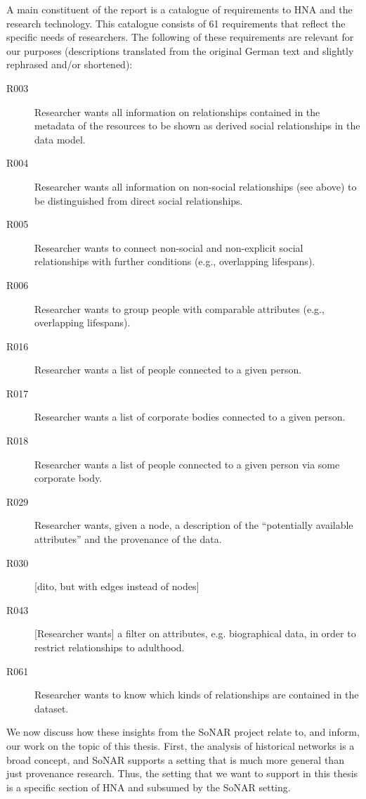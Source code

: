 A main constituent of the report is a catalogue of requirements
to HNA and the research technology. This catalogue consists of 61
requirements that reflect the specific needs of researchers.
The following of these requirements are relevant for our purposes
(descriptions translated from the original German text and slightly rephrased and/or shortened):
%
\begin{description}
  \item[R003]
    Researcher wants all information on relationships contained in the metadata of the resources
    to be shown as derived social relationships in the data model.
  \item[R004]
    Researcher wants all information on non-social
    relationships (see above) to be distinguished from direct social relationships.
  \item[R005]
    Researcher wants to connect non-social and non-explicit social relationships
    with further conditions (e.g., overlapping lifespans).
  \item[R006]
    Researcher wants to group people with comparable attributes (e.g., overlapping lifespans).
  \item[R016]
    Researcher wants a list of people connected to a given person.
  \item[R017]
    Researcher wants a list of corporate bodies connected to a given person.
  \item[R018]
    Researcher wants a list of people connected to a given person via some corporate body.
  \item[R029]
    Researcher wants, given a node, a description of the \enquote{potentially available attributes}
    and the provenance of the data.
  \item[R030]
    [dito, but with edges instead of nodes]
  \item[R043]
    [Researcher wants] a filter on attributes, e.g. biographical data, in order to
    restrict relationships to adulthood.
  \item[R061]
    Researcher wants to know which kinds of relationships are contained in the dataset.
\end{description}

We now discuss how these insights from the SoNAR project relate to, and inform, our work on the topic of this thesis.
First, the analysis of historical networks is a broad concept, and SoNAR supports a setting
that is much more general than just provenance research.
Thus, the setting that we want to support in this thesis is a specific section of HNA and subsumed 
by the SoNAR setting.

